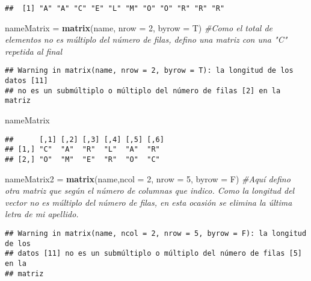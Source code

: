 \documentclass[]{article}
\newenvironment{Shaded}{\begin{snugshade}}{\end{snugshade}}
\newcommand{\KeywordTok}[1]{\textcolor[rgb]{0.13,0.29,0.53}{\textbf{#1}}}
\newcommand{\DataTypeTok}[1]{\textcolor[rgb]{0.13,0.29,0.53}{#1}}
\newcommand{\DecValTok}[1]{\textcolor[rgb]{0.00,0.00,0.81}{#1}}
\newcommand{\StringTok}[1]{\textcolor[rgb]{0.31,0.60,0.02}{#1}}
\newcommand{\CommentTok}[1]{\textcolor[rgb]{0.56,0.35,0.01}{\textit{#1}}}
\newcommand{\NormalTok}[1]{#1}
\begin{document}
\begin{verbatim}
##  [1] "A" "A" "C" "E" "L" "M" "O" "O" "R" "R" "R"
\end{verbatim}

\begin{Shaded}
\begin{Highlighting}[]
\NormalTok{nameMatrix =}\StringTok{ }\KeywordTok{matrix}\NormalTok{(name, }\DataTypeTok{nrow =} \DecValTok{2}\NormalTok{, }\DataTypeTok{byrow =}\NormalTok{ T) }\CommentTok{#Como el total de elementos no es múltiplo del número de filas, defino una matriz con una "C" repetida al final}
\end{Highlighting}
\end{Shaded}

\begin{verbatim}
## Warning in matrix(name, nrow = 2, byrow = T): la longitud de los datos [11]
## no es un submúltiplo o múltiplo del número de filas [2] en la matriz
\end{verbatim}

\begin{Shaded}
\begin{Highlighting}[]
\NormalTok{nameMatrix}
\end{Highlighting}
\end{Shaded}

\begin{verbatim}
##      [,1] [,2] [,3] [,4] [,5] [,6]
## [1,] "C"  "A"  "R"  "L"  "A"  "R" 
## [2,] "O"  "M"  "E"  "R"  "O"  "C"
\end{verbatim}

\begin{Shaded}
\begin{Highlighting}[]
\NormalTok{nameMatrix2 =}\StringTok{ }\KeywordTok{matrix}\NormalTok{(name,}\DataTypeTok{ncol =} \DecValTok{2}\NormalTok{, }\DataTypeTok{nrow =} \DecValTok{5}\NormalTok{, }\DataTypeTok{byrow =}\NormalTok{ F) }\CommentTok{#Aquí defino otra matriz que según el número de columnas que indico. Como la longitud del vector no es múltiplo del número de filas, en esta ocasión se elimina la última letra de mi apellido.}
\end{Highlighting}
\end{Shaded}

\begin{verbatim}
## Warning in matrix(name, ncol = 2, nrow = 5, byrow = F): la longitud de los
## datos [11] no es un submúltiplo o múltiplo del número de filas [5] en la
## matriz
\end{verbatim}
\end{document}
